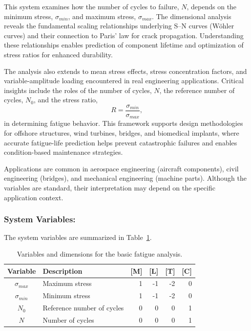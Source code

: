 \begin{codebox}
This system examines how the number of cycles to failure, $N$, depends on the minimum stress, $\sigma_{min}$, and maximum stress, $\sigma_{max}$. The dimensional analysis reveals the fundamental scaling relationships underlying S--N curves (Wöhler curves) and their connection to Paris' law for crack propagation. Understanding these relationships enables prediction of component lifetime and optimization of stress ratios for enhanced durability.

The analysis also extends to mean stress effects, stress concentration factors, and variable-amplitude loading encountered in real engineering applications. Critical insights include the roles of the number of cycles, $N$, the reference number of cycles, $N_0$, and the stress ratio,
\begin{equation}
R = \frac{\sigma_{min}}{\sigma_{max}},
\end{equation}
in determining fatigue behavior. This framework supports design methodologies for offshore structures, wind turbines, bridges, and biomedical implants, where accurate fatigue-life prediction helps prevent catastrophic failures and enables condition-based maintenance strategies.

Applications are common in aerospace engineering (aircraft components), civil engineering (bridges), and mechanical engineering (machine parts). Although the variables are standard, their interpretation may depend on the specific application context.
\end{codebox}

\subsubsection*{System Variables:}
The system variables are summarized in Table~\ref{tab:fatigue_variables}.

\begin{table}[H]
\centering
\begin{tabular}{|c|l|r|r|r|r|}
\hline
\textbf{Variable} & \textbf{Description} & \textbf{[M]} & \textbf{[L]} & \textbf{[T]} & \textbf{[C]} \\
\hline
$\sigma_{max}$ & Maximum stress & 1 & -1 & -2 & 0 \\
$\sigma_{min}$ & Minimum stress & 1 & -1 & -2 & 0 \\
$N_0$ & Reference number of cycles & 0 & 0 & 0 & 1 \\
$N$ & Number of cycles & 0 & 0 & 0 & 1 \\
\hline
\end{tabular}
\caption{Variables and dimensions for the basic fatigue analysis.}
\label{tab:fatigue_variables}
\end{table}

